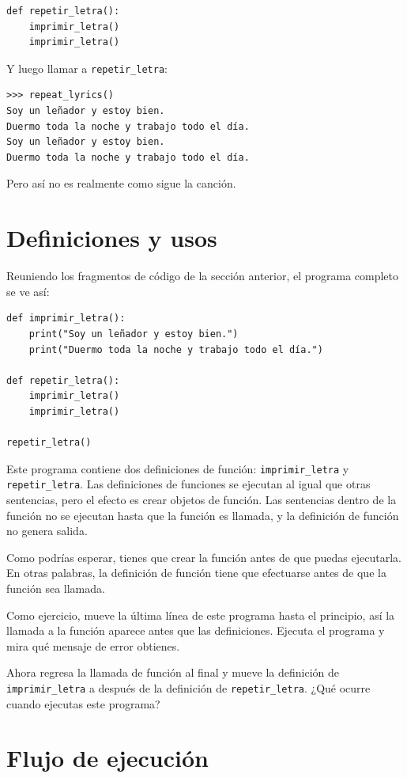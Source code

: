 \documentclass[10pt]{book}
\begin{document}
\begin{verbatim}
def repetir_letra():
    imprimir_letra()
    imprimir_letra()
\end{verbatim}
%
Y luego llamar a \verb"repetir_letra":

\begin{verbatim}
>>> repeat_lyrics()
Soy un leñador y estoy bien.
Duermo toda la noche y trabajo todo el día.
Soy un leñador y estoy bien.
Duermo toda la noche y trabajo todo el día.
\end{verbatim}
%
Pero así no es realmente como sigue la canción.


\section{Definiciones y usos}

Reuniendo los fragmentos de código de la sección anterior, el
programa completo se ve así:

\begin{verbatim}
def imprimir_letra():
    print("Soy un leñador y estoy bien.")
    print("Duermo toda la noche y trabajo todo el día.")

def repetir_letra():
    imprimir_letra()
    imprimir_letra()

repetir_letra()
\end{verbatim}
%
Este programa contiene dos definiciones de función: \verb"imprimir_letra" y
\verb"repetir_letra".  Las definiciones de funciones se ejecutan al igual que otras
sentencias, pero el efecto es crear objetos de función.  Las sentencias
dentro de la función no se ejecutan hasta que la función es llamada, y
la definición de función no genera salida.

Como podrías esperar, tienes que crear la función antes de que puedas
ejecutarla.  En otras palabras, la definición de función tiene que efectuarse
antes de que la función sea llamada.

Como ejercicio, mueve la última línea de este programa
hasta el principio, así la llamada a la función aparece antes que las definiciones. Ejecuta
el programa y mira qué mensaje
de error obtienes.

Ahora regresa la llamada de función al final
y mueve la definición de \verb"imprimir_letra" a después de la definición de
\verb"repetir_letra".  ¿Qué ocurre cuando ejecutas este programa?


\section{Flujo de ejecución}
\end{document}
